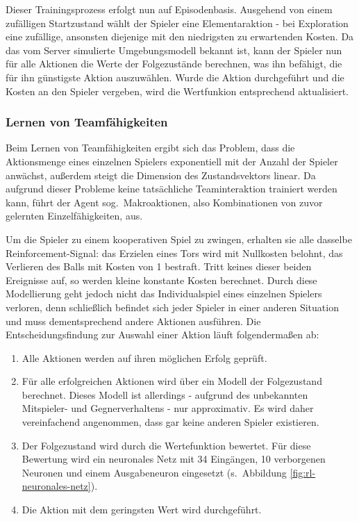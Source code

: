 Dieser Trainingsprozess erfolgt nun auf Episodenbasis. Ausgehend von einem
zufälligen Startzustand wählt der Spieler eine Elementaraktion - bei
Exploration eine zufällige, ansonsten diejenige mit den niedrigsten zu
erwartenden Kosten. Da das vom Server simulierte Umgebungsmodell bekannt ist,
kann der Spieler nun für alle Aktionen die Werte der Folgezustände berechnen,
was ihn befähigt, die für ihn günstigste Aktion auszuwählen. Wurde die Aktion
durchgeführt und die Kosten an den Spieler vergeben, wird die Wertfunkion
entsprechend aktualisiert.

\subsubsection{Lernen von Teamfähigkeiten}
Beim Lernen von Teamfähigkeiten ergibt sich das Problem, dass die Aktionsmenge
eines einzelnen Spielers exponentiell mit der Anzahl der Spieler anwächst,
außerdem steigt die Dimension des Zustandsvektors linear. Da aufgrund
dieser Probleme keine tatsächliche Teaminteraktion trainiert werden kann, führt
der Agent sog.\ Makroaktionen, also Kombinationen von zuvor gelernten
Einzelfähigkeiten, aus.

Um die Spieler zu einem kooperativen Spiel zu zwingen, erhalten sie alle 
dasselbe Reinforcement-Signal: das Erzielen eines Tors wird mit Nullkosten 
belohnt, das Verlieren des Balls mit Kosten von 1 bestraft. Tritt keines dieser 
beiden Ereignisse auf, so werden kleine konstante Kosten berechnet. Durch diese 
Modellierung geht jedoch nicht das Individualspiel eines einzelnen Spielers 
verloren, denn schließlich befindet sich jeder Spieler in einer anderen 
Situation und muss dementsprechend andere Aktionen ausführen. Die 
Entscheidungsfindung zur Auswahl einer Aktion läuft folgendermaßen ab:

\begin{enumerate}
  \item Alle Aktionen werden auf ihren möglichen Erfolg geprüft.
  \item Für alle erfolgreichen Aktionen wird über ein Modell der Folgezustand
  berechnet. Dieses Modell ist allerdings - aufgrund des unbekannten Mitspieler-
  und Gegnerverhaltens - nur approximativ. Es wird daher vereinfachend
  angenommen, dass gar keine anderen Spieler existieren.
  \item Der Folgezustand wird durch die Wertefunktion bewertet. Für diese
  Bewertung wird ein neuronales Netz mit 34 Eingängen, 10 verborgenen Neuronen
  und einem Ausgabeneuron eingesetzt (s.\ Abbildung \ref{fig:rl-neuronales-netz}).
  \item Die Aktion mit dem geringsten Wert wird durchgeführt.
\end{enumerate}

